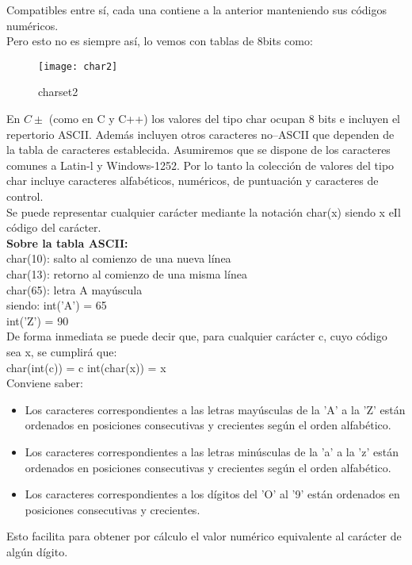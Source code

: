 \documentclass[11pt,a4paper]{article}
\begin{document}
	
	Compatibles entre sí, cada una contiene a la anterior manteniendo sus códigos numéricos.\\
	Pero esto no es siempre así, lo vemos con tablas de 8bits como:\\
	
		\begin{figure}[htb]
		\centering
		\texttt{[image: char2]}
		\caption{charset2}
		\label{fig:char2}
	\end{figure}
	En $C\pm$ (como en C y C++) los valores del tipo char ocupan 8 bits e incluyen el repertorio ASCII. Además incluyen otros caracteres no--ASCII que dependen de la tabla de caracteres establecida. Asumiremos que se dispone de los caracteres comunes a Latin-l y Windows-1252. Por lo tanto la colección de valores del tipo char incluye caracteres alfabéticos, numéricos, de puntuación y caracteres de control.\\
	Se puede representar cualquier carácter 
	mediante la notación char(x) siendo x eIl código del carácter.\\
	 \textbf{Sobre la tabla ASCII:}\\
	char(10): salto al comienzo de una nueva línea\\
	char(13): retorno al comienzo de una misma línea\\
	char(65): letra A mayúscula\\
	siendo:
	int('A') = 65\\
	int('Z') = 90\\
	De forma inmediata se puede decir que, para cualquier carácter c, cuyo código sea x, se cumplirá que:\\
	char(int(c)) = c
	int(char(x)) = x\\
	Conviene saber:
	\begin{itemize}
		\item Los caracteres correspondientes a las letras mayúsculas de la 'A' a la 'Z' 
		están ordenados en posiciones consecutivas y crecientes según el orden alfabético. 
		\item Los caracteres correspondientes a las letras minúsculas de la 'a' a la 'z' 
		están ordenados en posiciones consecutivas y crecientes según el orden alfabético.
		\item Los caracteres correspondientes a los dígitos del 'O' al '9' están ordenados en posiciones consecutivas y crecientes.
	\end{itemize}
	Esto facilita para obtener por cálculo el valor numérico equivalente al carácter de algún dígito.\\
\end{document}
